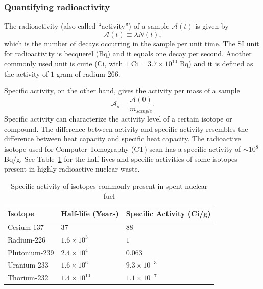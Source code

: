 \documentclass[nofootinbib,preprint,aps]{revtex4-1}
\begin{document}
        \subsubsection{Quantifying radioactivity}
        The radioactivity (also called ``activity'') of a sample $\mathcal{A}(t)$ is given by
        \begin{equation}
            \label{eq:act}
            \mathcal{A}(t)\equiv \lambda N(t),
        \end{equation}
        which is the number of decays occurring in the sample per unit time. The SI
        unit for radioactivity is becquerel (Bq) and it equals one decay per second. Another commonly used
        unit is curie (Ci, with $1\text{ Ci}=3.7\times 10^{10}\text{ Bq}$) and it is defined as
        the activity of $1$ gram of radium-266.

        Specific activity, on the other hand, gives the activity per mass of a sample
        \begin{equation}
        \mathcal{A}_s = \frac{\mathcal{A}(0)}{{m_{sample}}}.
        \end{equation}
        Specific activity can characterize the activity level of a certain isotope or compound.
        The difference between
        activity and specific activity resembles the difference between heat capacity and specific heat
        capacity.
        The radioactive isotope used for Computer Tomography (CT) scan has a specific activity
        of $\sim 10^{8}$ Bq/g. See Table~\ref{tab:hl} for the half-lives and specific activities
        of some isotopes present in highly radioactive nuclear waste.
        \begin{table}
            \centering
            \caption{Specific activity of isotopes commonly present in spent nuclear fuel \cite{toi}}
            \begin{ruledtabular}
                \begin{tabular}{l l l}
                Isotope & Half-life (Years) & Specific Activity (Ci/g)\\
                \hline
                Cesium-137 & $37$ & $88$\\
                Radium-226 & $1.6\times 10^3$ & $1$\\
                Plutonium-239 & $2.4\times 10^4$ & $0.063$\\
                Uranium-233 & $1.6\times 10^6$ & $9.3\times 10^{-3}$\\
                Thorium-232 & $1.4 \times 10^{10}$ & $1.1\times 10^{-7}$\\
            \end{tabular}
            \label{tab:hl}
            \end{ruledtabular}
        \end{table}
\end{document}
